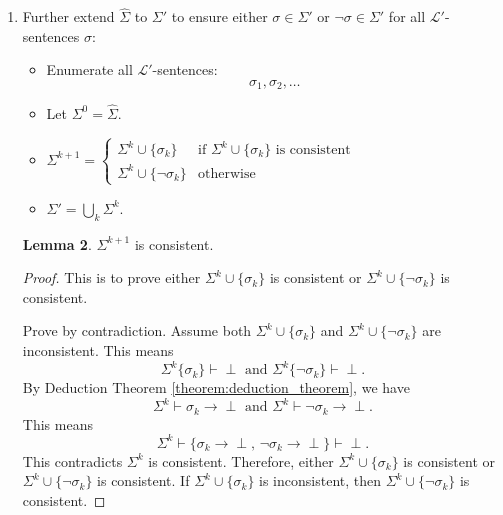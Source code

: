 \documentclass[11pt,letterpaper]{book}
\theoremstyle{definition}
\newtheorem{lemma}{Lemma}[section]
\begin{document}
\begin{enumerate}
\begin{itemize}
{}
\end{itemize}

\begin{lemma}\label{lemma:sigma_hat_consistent}
$\hat{\Sigma}$ is consistent as $\mathcal{L}'$-sentences.
\end{lemma}

\begin{proof}
Prove by contradiction. Assume $\hat{\Sigma} = \bigcup_i \Sigma_i$ is
not consistent. This means $\bigcup_i \Sigma_i \vdash \perp$.

Then there exists finite set $\Gamma \subseteq\bigcup_i \Sigma_i $ and
$\Gamma \vdash \perp$.

Choose $k$ large enough such that $\Gamma \subseteq \Sigma_k$, then
$$ \Gamma \vdash \perp \text{ implies } \Sigma_k \vdash \perp .$$
Contradiction observes as $\Sigma_k$ is consistent.

\end{proof}

\item{Further extend $\hat{\Sigma}$ to $\Sigma'$ to ensure either
$\sigma \in \Sigma'$ or $\lnot \sigma \in \Sigma'$ for all
$\mathcal{L}'$-sentences $\sigma$:}

\begin{itemize}
\item{Enumerate all $\mathcal{L}'$-sentences:
$$ \sigma_1, \sigma_2, \ldots $$
}
\item{Let $\Sigma^0 = \hat{\Sigma}$.}
\item{$ \Sigma^{k+1} = \begin{cases} \Sigma^k \cup \{ \sigma_k \} &
\text{if } \Sigma^k \cup \{ \sigma_k \} \text{ is consistent} \\
\Sigma^k \cup \{ \lnot \sigma_k \} & \text{otherwise} \end{cases} $
}
\item{$ \Sigma' = \bigcup_k \Sigma^k $.}
\end{itemize}

\begin{lemma}
$\Sigma^{k+1}$ is consistent.
\end{lemma}

\begin{proof}
This is to prove either $\Sigma^k \cup \{ \sigma_k \}$ is consistent or
$\Sigma^k \cup \{ \lnot \sigma_k \} $ is consistent.

Prove by contradiction. Assume both $\Sigma^k \cup \{ \sigma_k \}$ and
$\Sigma^k \cup \{ \lnot \sigma_k \} $ are inconsistent. This means
$$ \Sigma^k \{ \sigma_k \} \vdash \perp \text{ and } \Sigma^k \{ \lnot
\sigma_k \} \vdash \perp  .$$
By Deduction Theorem \ref{theorem:deduction_theorem}, we have
$$ \Sigma^k \vdash \sigma_k \rightarrow \perp \text{ and } \Sigma^k
\vdash \lnot \sigma_k \rightarrow \perp .$$
This means
$$ \Sigma^k \vdash \{ \sigma_k \rightarrow \perp, \, \lnot \sigma_k
\rightarrow \perp \} \vdash \perp .$$
This contradicts $\Sigma^k$ is consistent. Therefore, either $\Sigma^k
\cup \{ \sigma_k \}$ is consistent or $\Sigma^k \cup \{ \lnot \sigma_k
\} $ is consistent. If
$\Sigma^k \cup \{ \sigma_k \}$ is inconsistent, then $\Sigma^k \cup \{
\lnot \sigma_k \} $ is consistent.


\end{proof}
\end{enumerate}
\end{document}

